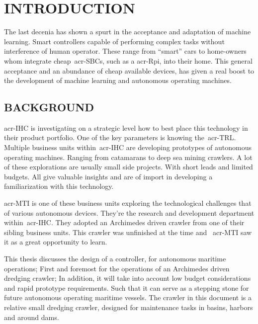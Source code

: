 

\chapter{INTRODUCTION}\label{chap:introduction}

The last decenia has shown a spurt in the acceptance and adaptation of machine learning. Smart controllers
capable of performing complex tasks without interference of human operator. These range from ``smart'' cars to 
home-owners whom integrate cheap~\glspl{acr-SBC}, such as a \gls{acr-Rpi}, into their home. This general acceptance 
and an abundance of cheap available devices, has given a real boost to the development of machine learning and 
autonomous operating machines.


\section{BACKGROUND}\label{sec:background}

\gls{acr-IHC} is investigating on a strategic level how to best place this technology in their product portfolio. One
of the key parameters is knowing the~\gls{acr-TRL}. Multiple business units within~\gls{acr-IHC} are developing
prototypes of autonomous operating machines. Ranging from catamarans to deep sea mining crawlers. A lot of these
explorations are usually small side projects. With short leads and limited budgets. All give valuable insights
and are of import in developing a familiarization with this technology.

\gls{acr-MTI} is one of these business units exploring the technological challenges that of various autonomous devices.
They're the research and development department within~\gls{acr-IHC}. They adopted an Archimedes driven crawler from
one of their sibling business units. This crawler was unfinished at the time and ~\gls{acr-MTI} saw it as a great
opportunity to learn.

This thesis discusses the design of a controller, for autonomous maritime operations; First and foremost for the
operations of an Archimedes driven dredging crawler; In addition, it will take into account low budget considerations
and rapid prototype requirements. Such that it can serve as a stepping stone for future autonomous operating maritime
vessels. The crawler in this document is a relative small dredging crawler, designed for maintenance tasks in
basins, harbors and around dams.


